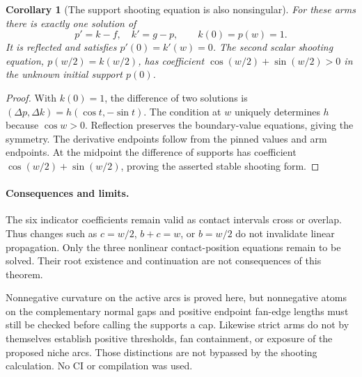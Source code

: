 \documentclass[11pt]{article}
\newtheorem{corollary}{Corollary}
\begin{document}
\begin{corollary}[The support shooting equation is also nonsingular]
For these arms there is exactly one solution of
\[
 p'=k-f,\quad k'=g-p,\qquad k(0)=p(w)=1.
\]
It is reflected and satisfies $p'(0)=k'(w)=0$. The second scalar shooting equation, $p(w/2)=k(w/2)$, has coefficient $\cos(w/2)+\sin(w/2)>0$ in the unknown initial support $p(0)$.
\end{corollary}
\begin{proof}
With $k(0)=1$, the difference of two solutions is $(\Delta p,\Delta k)=h(\cos t,-\sin t)$. The condition at $w$ uniquely determines $h$ because $\cos w>0$. Reflection preserves the boundary-value equations, giving the symmetry. The derivative endpoints follow from the pinned values and arm endpoints. At the midpoint the difference of supports has coefficient $\cos(w/2)+\sin(w/2)$, proving the asserted stable shooting form.
\end{proof}

\paragraph{Consequences and limits.}
The six indicator coefficients remain valid as contact intervals cross or overlap. Thus changes such as $c=w/2$, $b+c=w$, or $b=w/2$ do not invalidate linear propagation. Only the three nonlinear contact-position equations remain to be solved. Their root existence and continuation are not consequences of this theorem.

Nonnegative curvature on the active arcs is proved here, but nonnegative atoms on the complementary normal gaps and positive endpoint fan-edge lengths must still be checked before calling the supports a cap. Likewise strict arms do not by themselves establish positive thresholds, fan containment, or exposure of the proposed niche arcs. Those distinctions are not bypassed by the shooting calculation. No CI or compilation was used.
\end{document}
